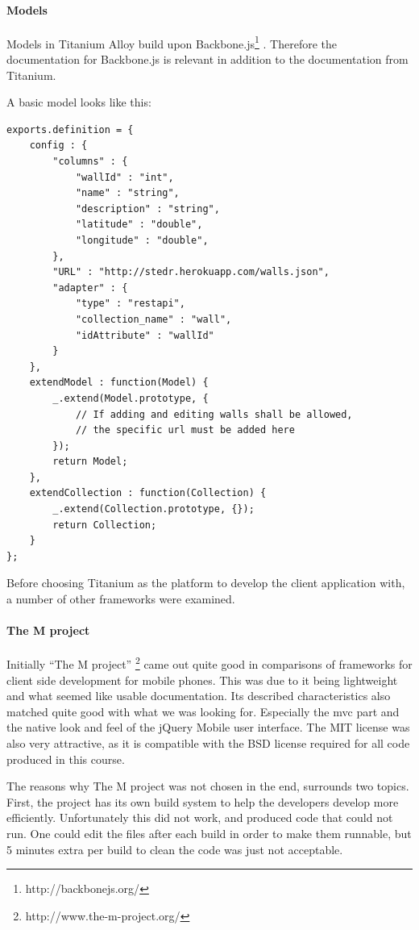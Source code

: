 \documentclass[11pt]{book}
\begin{document}
\paragraph{Models}
Models in Titanium Alloy build upon Backbone.js\footnote{http://backbonejs.org/} \cite{titaniumAlloyModel}. Therefore the documentation for Backbone.js is relevant in addition to the documentation from Titanium.

A basic model looks like this:
\begin{lstlisting}[frame=single]
exports.definition = {
    config : {
        "columns" : {
            "wallId" : "int",
            "name" : "string",
            "description" : "string",
            "latitude" : "double",
            "longitude" : "double",
        },
        "URL" : "http://stedr.herokuapp.com/walls.json",
        "adapter" : {
            "type" : "restapi",
            "collection_name" : "wall",
            "idAttribute" : "wallId"
        }
    },
    extendModel : function(Model) {
        _.extend(Model.prototype, {
            // If adding and editing walls shall be allowed,
            // the specific url must be added here
        });
        return Model;
    },
    extendCollection : function(Collection) {
        _.extend(Collection.prototype, {});
        return Collection;
    }
};
\end{lstlisting}

Before choosing Titanium as the platform to develop the client application with, a number of other frameworks were examined.

\paragraph{The M project}
Initially “The M project” \footnote{http://www.the-m-project.org/} came out quite good in comparisons of frameworks for client side development for mobile phones. This was due to it being lightweight and what seemed like usable documentation. Its described characteristics also matched quite good with what we was looking for. Especially the \gls{mvc} part and the native look and feel of the jQuery Mobile user interface. The MIT license was also very attractive, as it is compatible with the BSD license required for all code produced in this course.

The reasons why The M project was not chosen in the end, surrounds two topics. First, the project has its own build system to help the developers develop more efficiently. Unfortunately this did not work, and produced code that could not run. One could edit the files after each build in order to make them runnable, but 5 minutes extra per build to clean the code was just not acceptable.
\end{document}
